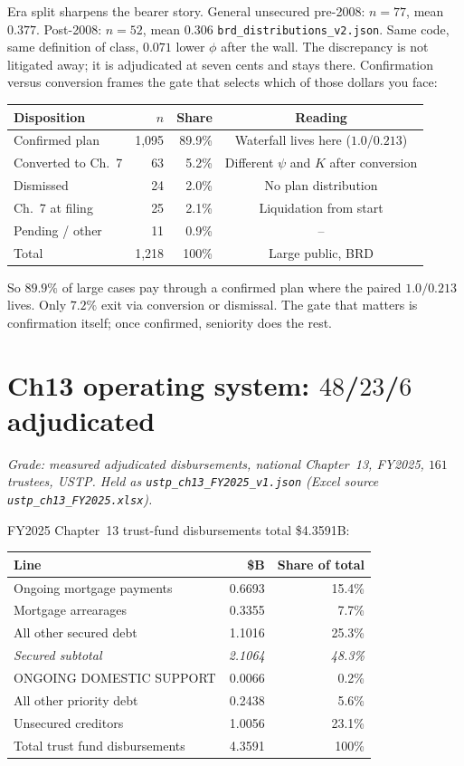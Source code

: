 Era split sharpens the bearer story. General unsecured pre-2008: $n=77$, mean $0.377$. Post-2008: $n=52$, mean $0.306$ \texttt{brd\_distributions\_v2.json}. Same code, same definition of class, $0.071$ lower $\phi$ after the wall. The discrepancy is not litigated away; it is adjudicated at seven cents and stays there. Confirmation versus conversion frames the gate that selects which of those dollars you face:

\begin{center}
\small
\begin{tabular}{lrrc}
\toprule
Disposition & $n$ & Share & Reading \\
\midrule
Confirmed plan & 1,095 & 89.9\% & Waterfall lives here ($1.0$/$0.213$) \\
Converted to Ch.~7 & 63 & 5.2\% & Different $\psi$ and $K$ after conversion \\
Dismissed & 24 & 2.0\% & No plan distribution \\
Ch.~7 at filing & 25 & 2.1\% & Liquidation from start \\
Pending / other & 11 & 0.9\% & -- \\
Total & 1,218 & 100\% & Large public, BRD \\
\bottomrule
\end{tabular}
\end{center}

So $89.9\%$ of large cases pay through a confirmed plan where the paired $1.0/0.213$ lives. Only $7.2\%$ exit via conversion or dismissal. The gate that matters is confirmation itself; once confirmed, seniority does the rest.

\section{Ch13 operating system: $48$/$23$/$6$ adjudicated}
\label{sec:ustp}

\textit{Grade: measured adjudicated disbursements, national Chapter~13, FY2025, $161$ trustees, USTP. Held as \texttt{ustp\_ch13\_FY2025\_v1.json} (Excel source \texttt{ustp\_ch13\_FY2025.xlsx}).}

FY2025 Chapter~13 trust-fund disbursements total \$4.3591B:

\begin{center}
\small
\begin{tabular}{lrr}
\toprule
Line & \$B & Share of total \\
\midrule
Ongoing mortgage payments & 0.6693 & 15.4\% \\
Mortgage arrearages & 0.3355 & 7.7\% \\
All other secured debt & 1.1016 & 25.3\% \\
\textit{Secured subtotal} & \textit{2.1064} & \textit{48.3\%} \\
ONGOING DOMESTIC SUPPORT & 0.0066 & 0.2\% \\
All other priority debt & 0.2438 & 5.6\% \\
Unsecured creditors & 1.0056 & 23.1\% \\
Total trust fund disbursements & 4.3591 & 100\% \\
\bottomrule
\end{tabular}
\end{center}

